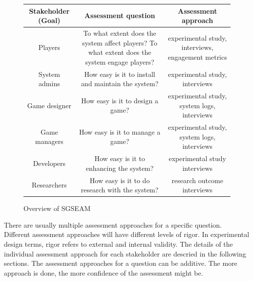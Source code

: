 \documentclass{sigchi}
\newcommand\tabhead[1]{\small\textbf{#1}}
\begin{document}
\begin{figure}[ht!]
  \centering
  \begin{tabular}{|c|c|c|}
    \hline
    \multicolumn{1}{|p{0.2\columnwidth}|}{\centering\tabhead{Stakeholder (Goal)}} &
    \multicolumn{1}{|p{0.35\columnwidth}|}{\centering\tabhead{Assessment question}} &
    \multicolumn{1}{|p{0.35\columnwidth}|}{\centering\tabhead{Assessment approach}} \\
    \hline
    \multicolumn{1}{|p{0.2\columnwidth}|}{Players} &
    \multicolumn{1}{|p{0.35\columnwidth}|}{To what extent does the system affect players?
        To what extent does the system engage players?} &
    \multicolumn{1}{|p{0.35\columnwidth}|}{experimental study, interviews,
                engagement metrics} \\
    \hline
    \multicolumn{1}{|p{0.2\columnwidth}|}{System admins} &
    \multicolumn{1}{|p{0.35\columnwidth}|}{How easy is it to install and maintain the system?} &
    \multicolumn{1}{|p{0.35\columnwidth}|}{experimental study, interviews} \\
    \hline
    \multicolumn{1}{|p{0.2\columnwidth}|}{Game designer} &
    \multicolumn{1}{|p{0.35\columnwidth}|}{How easy is it to design a game?} &
    \multicolumn{1}{|p{0.35\columnwidth}|}{experimental study, system logs, interviews } \\
    \hline
    \multicolumn{1}{|p{0.2\columnwidth}|}{Game managers} &
    \multicolumn{1}{|p{0.35\columnwidth}|}{How easy is it to manage a game?} &
    \multicolumn{1}{|p{0.35\columnwidth}|}{experimental study, system logs, interviews} \\
    \hline
    \multicolumn{1}{|p{0.2\columnwidth}|}{Developers} &
    \multicolumn{1}{|p{0.35\columnwidth}|}{How easy is it to enhancing the system?} &
    \multicolumn{1}{|p{0.35\columnwidth}|}{experimental study interviews} \\
    \hline
    \multicolumn{1}{|p{0.2\columnwidth}|}{Researchers} &
    \multicolumn{1}{|p{0.35\columnwidth}|}{How easy is it to do research with the system?} &
    \multicolumn{1}{|p{0.35\columnwidth}|}{research outcome interviews} \\
    \hline
  \end{tabular}
  \caption{Overview of SGSEAM}
  \label{fig:overview}
\end{figure}

There are usually multiple assessment approaches for a specific question. Different assessment
approaches will have different levels of rigor. In experimental design terms, rigor refers to
external and internal validity. The details of the individual assessment approach for each
stakeholder are descried in the following sections. The assessment approaches for a question
can be additive. The more approach is done, the more confidence of the assessment might be.
\end{document}
